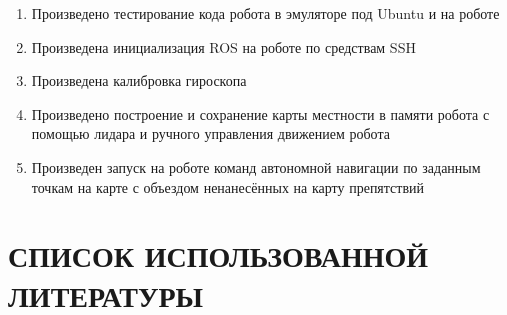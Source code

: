 \documentclass[a4paper]{article}
\begin{document}
\begin{enumerate}[series=listWWNumv,label=\arabic*),ref=\arabic*]
\begin{enumerate}[resume*=listWWNumv,start=1]
\item Произведено тестирование кода робота в эмуляторе под Ubuntu и на роботе
\item Произведена инициализация ROS на роботе по средствам SSH
\item Произведена калибровка гироскопа
\item Произведено построение и сохранение карты местности в памяти робота с помощью лидара и ручного управления
движением робота
\item Произведен запуск на роботе команд автономной навигации по заданным точкам на карте с объездом ненанесённых на
карту препятствий
\end{enumerate}
\end{enumerate}
\section{СПИСОК ИСПОЛЬЗОВАННОЙ ЛИТЕРАТУРЫ}
\end{document}
